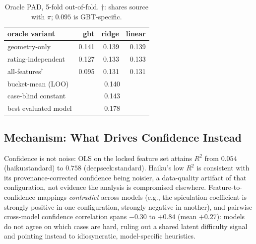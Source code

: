 \documentclass[letterpaper]{article} %
\begin{document}
\begin{table}[t]
\centering
\small
\begin{tabular}{lrrr}
\toprule
oracle variant & gbt & ridge & linear \\
\midrule
geometry-only            & 0.141 & 0.139 & 0.139 \\
rating-independent       & 0.127 & 0.133 & 0.133 \\
all-features$^\dagger$   & 0.095 & 0.131 & 0.131 \\
\midrule
bucket-mean (LOO) & \multicolumn{3}{c}{0.140} \\
case-blind constant      & \multicolumn{3}{c}{0.143} \\
best evaluated model     & \multicolumn{3}{c}{0.178} \\
\bottomrule
\end{tabular}
\caption{Oracle PAD, 5-fold out-of-fold. $\dagger$: shares source with $\pi$; $0.095$ is GBT-specific.}
\label{tab:oracle}
\end{table}

\subsection{Mechanism: What Drives Confidence Instead}
Confidence is not noise: OLS on the locked feature set attains $R^2$ from
$0.054$ (haiku:standard) to $0.758$ (deepseek:standard). Haiku's low $R^2$ is
consistent with its provenance-corrected confidence being noisier, a
data-quality artifact of that configuration, not evidence the analysis is
compromised elsewhere. Feature-to-confidence mappings \emph{contradict}
across models (e.g., the spiculation coefficient is strongly positive in one
configuration, strongly negative in another), and pairwise cross-model
confidence correlation spans $-0.30$ to $+0.84$ (mean $+0.27$): models do not
agree on which cases are hard, ruling out a shared latent difficulty signal
and pointing instead to idiosyncratic, model-specific heuristics.
\end{document}
